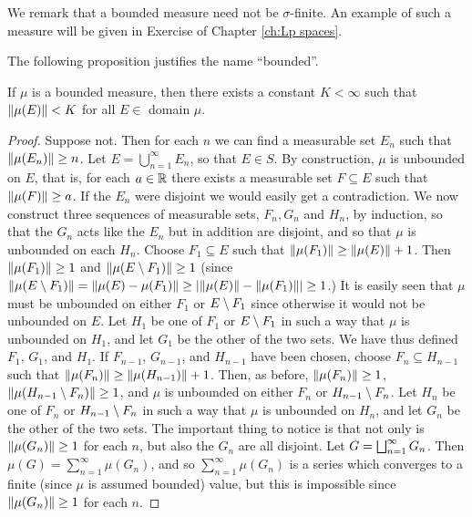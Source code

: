 We remark that a bounded measure need not be $\sigma$-finite. An example of such a measure will be given in Exercise of Chapter \ref{ch:Lp spaces}.

The following proposition justifies the name ``bounded''.

\begin{proposition}
\label{prop:bounded measure are bounded}
If $\mu$ is a bounded measure, then there exists a constant $K<\infty$ such that $\norm{\mu(E)}<K$ for all $E \in$ domain $\mu$.
\end{proposition}

\begin{proof}
Suppose not. Then for each $n$ we can find a measurable set $E_n$ such that $\norm{\mu(E_n)}\geq n$. Let $E=\bigcup_{n=1}^\infty E_n$, so that $E \in S$. By construction, $\mu$ is unbounded on $E$, that is, for each $a\in\mathbb{R}$ there exists a measurable set $F \subseteq E$ such that $\norm{\mu(F)}\geq a$. If the $E_n$ were disjoint we would easily get a contradiction. We now construct three sequences of measurable sets, $F_n, G_n$ and $H_n$, by induction, so that the $G_n$ acts like the $E_n$ but in addition are disjoint, and so that $\mu$ is unbounded on each $H_n$. Choose $F_1 \subseteq E$ such that $\norm{\mu(F_1)}\geq\norm{\mu(E)}+1$. Then $\norm{\mu(F_1)}\geq1$ and $\norm{\mu(E\setminus F_1)}\geq1$ (since $\norm{\mu(E\setminus F_1)}=\norm{\mu(E)-\mu(F_1)}\geq|\norm{\mu(E)}-\norm{\mu(F_1)}|\geq1$.) It is easily seen that $\mu$ must be unbounded on either $F_1$ or $E\setminus F_1$ since otherwise it would not be unbounded on $E$. Let $H_1$ be one of $F_1$ or $E\setminus F_1$ in such a way that $\mu$ is unbounded on $H_1$, and let $G_1$ be the other of the two sets. We have thus defined $F_1$, $G_1$, and $H_1$. If $F_{n-1}$, $G_{n-1}$, and $H_{n-1}$ have been chosen, choose $F_n\subseteq H_{n-1}$ such that $\norm{\mu(F_n)}\geq\norm{\mu(H_{n-1})}+1$. Then, as before, $\norm{\mu(F_n)}\geq1$, $\norm{\mu(H_{n-1}\setminus F_n)}\geq1$, and $\mu$ is unbounded on either $F_n$ or $H_{n-1}\setminus F_n$. Let $H_n$ be one of $F_n$ or $H_{n-1}\setminus F_n$ in such a way that $\mu$ is unbounded on $H_n$, and let $G_n$ be the other of the two sets. The important thing to notice is that not only is $\norm{\mu(G_n)}\geq1$ for each $n$, but also the $G_n$ are all disjoint. Let $G=\bigsqcup_{n=1}^\infty G_n$. Then $\mu(G)=\sum_{n=1}^\infty\mu(G_n)$, and so $\sum_{n=1}^\infty\mu(G_n)$ is a series which converges to a finite (since $\mu$ is assumed bounded) value, but this is impossible since $\norm{\mu(G_n)}\geq1$ for each $n$.
\end{proof}

